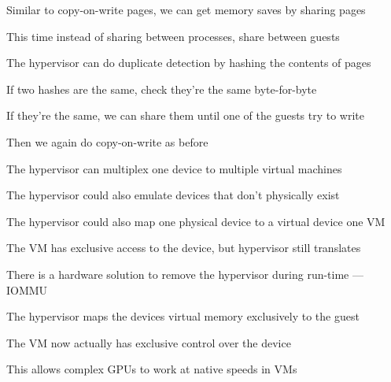  \begin{slide}
    

    Similar to copy-on-write pages, we can get memory saves by sharing pages

    \leftspace{}This time instead of sharing between processes, share between
                 guests
    \medskip

    The hypervisor can do duplicate detection by hashing the contents of pages

    \leftspace{}If two hashes are the same, check they're the same
                 byte-for-byte
    \medskip

    If they're the same, we can share them until one of the guests try to write

    \leftspace{}Then we again do copy-on-write as before

  \end{slide}

  \begin{slide}
    

    The hypervisor can multiplex one device to multiple virtual machines

    \leftspace{}The hypervisor could also emulate devices that don't
                 physically exist
    \medskip

    The hypervisor could also map one physical device to a virtual device
    one VM

    \leftspace{}The VM has exclusive access to the device, but hypervisor
                 still translates
    \medskip

    There is a hardware solution to remove the hypervisor during run-time ---
    IOMMU

    \leftspace{}The hypervisor maps the devices virtual memory exclusively
                 to the guest

    \leftspace{}\leftspace{}The VM now actually has exclusive control over the
    device

    \leftspace{}\leftspace{}\leftspace{}This allows complex GPUs to work at
    native speeds in VMs

  \end{slide}

